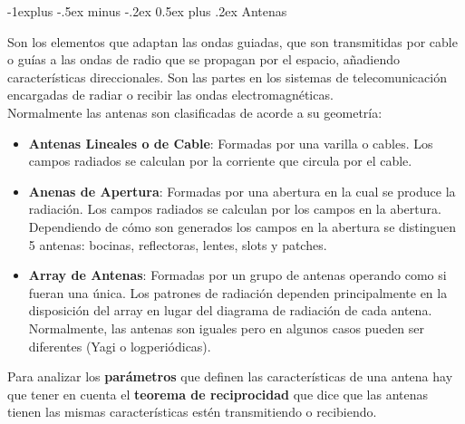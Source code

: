 \documentclass[10pt,portrait, twocolumn]{article}
\makeatletter
\renewcommand{\subsection}{\@startsection{subsection}{2}{0mm}%
                                {-1explus -.5ex minus -.2ex}%
                                {0.5ex plus .2ex}%
                                {\normalfont\normalsize\bfseries}}
\makeatother
\begin{document}
\subsection{Antenas}

Son los elementos que adaptan las ondas guiadas, que son transmitidas por cable o guías a las ondas de radio que se propagan por el espacio, añadiendo características direccionales. Son las partes en los sistemas de telecomunicación encargadas de radiar o recibir las ondas electromagnéticas.\\
Normalmente las antenas son clasificadas de acorde a su geometría:

	\begin{itemize}
	\item \textbf{Antenas Lineales o de Cable}: Formadas por una varilla o cables. Los campos radiados se calculan por la corriente que circula por el cable.
	\item \textbf{Anenas de Apertura}: Formadas por una abertura en la cual se produce la radiación. Los campos radiados se calculan por los campos en la abertura. Dependiendo de cómo son generados los campos en la abertura se distinguen 5 antenas: bocinas, reflectoras, lentes, slots y patches.
	\item \textbf{Array de Antenas}: Formadas por un grupo de antenas operando como si fueran una única. Los patrones de radiación dependen principalmente en la disposición del array en lugar del diagrama de radiación de cada antena. Normalmente, las antenas son iguales pero en algunos casos pueden ser diferentes (Yagi o logperiódicas).
	\end{itemize}
	
Para analizar los \textbf{parámetros} que definen las características de una antena hay que tener en cuenta el \textbf{teorema de reciprocidad} que dice que las antenas tienen las mismas características estén transmitiendo o recibiendo.
\end{document}
